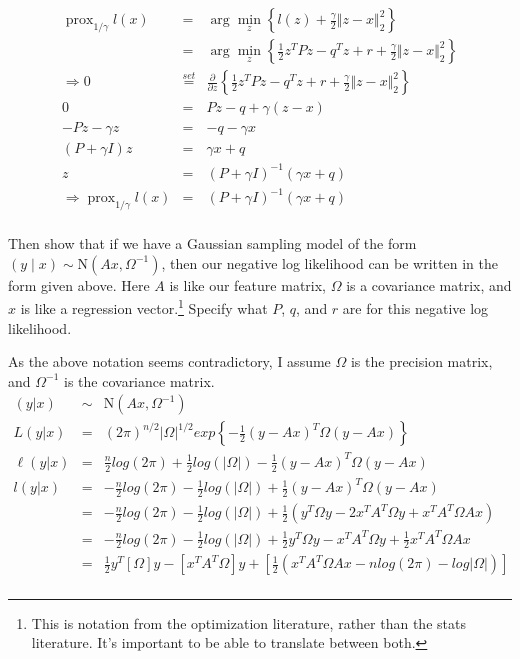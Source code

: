 \documentclass{article}
\newcommand{\N}{\mbox{N}}
\newcommand{\prox}{ \mathop{\mathrm{prox}} }
\newcommand{\enorm}[1]{\Vert #1 \Vert_2}
\begin{document}
\begin{enumerate}[(A)]
\color{blue}
\begin{eqnarray*}
\prox_{1/\gamma} l(x) &=&  \arg \min_{z } \left\{  l(z)+ \frac{\gamma}{2} \enorm{z - x}^2  \right\}\\
&=&  \arg \min_{z } \left\{  \frac{1}{2} z^{T} P z - q^{T} z + r+ \frac{\gamma}{2} \enorm{z - x}^2  \right\}\\
\Rightarrow 0 &\stackrel{set}{=}&  \frac{\partial}{\partial z} \left\{  \frac{1}{2} z^{T} P z - q^{T} z + r+ \frac{\gamma}{2} \enorm{z - x}^2  \right\}\\
 0 &=&  P z - q+  \gamma (z - x)  \\
 -Pz - \gamma z &=&  - q - \gamma x  \\
  (P + \gamma I) z &=&  \gamma x + q   \\
    z &=&  (P + \gamma I)^{-1}( \gamma x + q)   \\
\Rightarrow \prox_{1/\gamma} l(x) &=&  (P + \gamma I)^{-1}( \gamma x + q)   \\
\end{eqnarray*}
\color{black}

Then show that if we have a Gaussian sampling model of the form $(y \mid x) \sim \N(Ax, \Omega^{-1})$, then our negative log likelihood can be written in the form given above.  Here $A$ is like our feature matrix, $\Omega$ is a covariance matrix, and $x$ is like a regression vector.\footnote{This is notation from the optimization literature, rather than the stats literature.  It's important to be able to translate between both.}  Specify what $P$, $q$, and $r$ are for this negative log likelihood.

\color{blue}
As the above notation seems contradictory, I assume $\Omega$ is the precision matrix, and $\Omega^{-1}$ is the covariance matrix. 
\begin{eqnarray*}
(y  | x) &\sim& \N(Ax, \Omega^{-1}) \\
L(y  | x) &=& (2\pi)^{n/2} |\Omega|^{1/2} exp\left\{-\frac{1}{2} (y - Ax)^T \Omega (y-Ax) \right\} \\
\ell(y  | x) &=& \frac{n}{2}log(2\pi) + \frac{1}{2}log(|\Omega|) -\frac{1}{2} (y - Ax)^T \Omega (y-Ax) \\
l(y  | x) &=& - \frac{n}{2}log(2\pi) - \frac{1}{2}log(|\Omega|) + \frac{1}{2} (y - Ax)^T \Omega (y-Ax) \\
&=& - \frac{n}{2}log(2\pi) - \frac{1}{2}log(|\Omega|) + \frac{1}{2} \left( y^T \Omega y - 2x^TA^T \Omega y + x^TA^T \Omega Ax \right)\\
&=& - \frac{n}{2}log(2\pi) - \frac{1}{2}log(|\Omega|) +  \frac{1}{2} y^T \Omega y - x^TA^T \Omega y +  \frac{1}{2}x^TA^T \Omega Ax \\
&=& \frac{1}{2} y^T [\Omega] y  - [x^TA^T \Omega] y +  \left[ \frac{1}{2} \left( x^TA^T \Omega Ax - n log(2\pi) - log|\Omega|   \right)\right] \\
\end{eqnarray*}


\end{enumerate}
\end{document}
